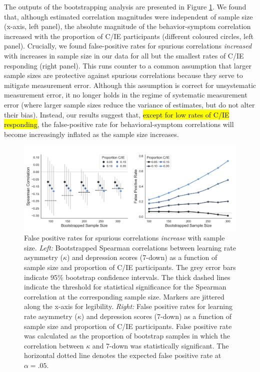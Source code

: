 \documentclass[a4paper,notitlepage,12pt]{article}
\begin{document}
\begin{refsection}[main]
The outputs of the bootstrapping analysis are presented in Figure \ref{fig:bootstrap}. We found that, although estimated correlation magnitudes were independent of sample size (x-axis, left panel), the absolute magnitude of the behavior-symptom correlation increased with the proportion of C/IE participants (different coloured circles, left panel). Crucially, we found false-positive rates for spurious correlations \emph{increased} with increases in sample size in our data for all but the smallest rates of C/IE responding (right panel). This runs counter to a common assumption that larger sample sizes are protective against spurious correlations because they serve to mitigate measurement error. Although this assumption is correct for unsystematic measurement error, it no longer holds in the regime of systematic measurement error (where larger sample sizes reduce the variance of estimates, but do not alter their bias). Instead, our results suggest that, \hl{except for low rates of C/IE responding}, the false-positive rate for behavioral-symptom correlations will become increasingly inflated as the sample size increases.

\begin{figure}[!t]
\includegraphics[width=16cm]{../figures/main_03b.png}
\centering
\captionsetup{width=0.88\textwidth}
\caption{False positive rates for spurious correlations \emph{increase} with sample size. \textit{Left:} Bootstrapped Spearman correlations between learning rate asymmetry ($\kappa$) and depression scores (7-down) as a function of sample size and proportion of C/IE participants. The grey error bars indicate 95\% bootstrap confidence intervals. The thick dashed lines indicate the threshold for statistical significance for the Spearman correlation at the corresponding sample size. Markers are jittered along the x-axis for legibility. \textit{Right:} False positive rates for learning rate asymmetry ($\kappa$) and depression scores (7-down) as a function of sample size and proportion of C/IE participants. False positive rate was calculated as the proportion of bootstrap samples in which the correlation between $\kappa$ and 7-down was statistically significant. The horizontal dotted line denotes the expected false positive rate at $\alpha = .05$.}
\label{fig:bootstrap}
\end{figure}


\end{refsection}
\end{document}
